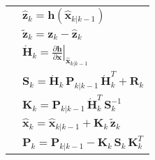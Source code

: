 \begingroup
\renewcommand{\arraystretch}{1.25}
\begin{tabular}{l l}
\phantom{.} & $\hat{\mathbf{z}}_{k} = \mathbf{h} \left( \hat{\mathbf{x}}_{k|k-1} \right)$ \\
\phantom{.} & $\tilde{\mathbf{z}}_k = \mathbf{z}_k - \hat{\mathbf{z}}_k$ \\
\phantom{.} & $\mathbf{\acute{H}}_{k} = \left. \displaystyle{\frac{\partial \mathbf{h}}{\partial \mathbf{x}}} \right|_{\hat{\mathbf{x}}_{k|k-1}}$ \\
\phantom{.} & $\mathbf{S}_{k} = \mathbf{\acute{H}}_{k} \, \mathbf{P}_{k|k-1} \, \mathbf{\acute{H}}_{k}^T + \mathbf{R}_{k}$ \\
\phantom{.} & $\mathbf{K}_{k} = \mathbf{P}_{k|k-1} \, \mathbf{\acute{H}}_{k}^T \, \mathbf{S}_{k}^{-1}$ \\
\phantom{.} & $\hat{\mathbf{x}}_k = \hat{\mathbf{x}}_{k|k-1} +\mathbf{K}_k \, \tilde{\mathbf{z}}_k$ \\
\phantom{.} & $\mathbf{P}_k = \mathbf{P}_{k|k-1} - \mathbf{K}_{k} \, \mathbf{S}_{k} \, \mathbf{K}_{k}^T$
\end{tabular}
\endgroup

